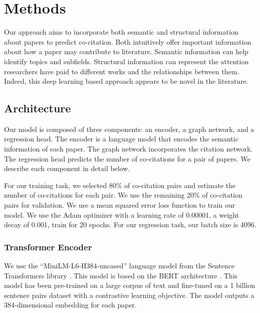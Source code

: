 \documentclass[10pt,twocolumn,letterpaper]{article}
\begin{document}
\section{Methods}


Our approach aims to incorporate both semantic and structural information about papers to predict co-citation. Both intuitively offer important information about how a paper may contribute to literature. Semantic information can help identify topics and subfields. Structural information can represent the attention researchers have paid to different works and the relationships between them. Indeed, this deep learning based approach appears to be novel in the literature. 

\subsection{Architecture}

Our model is composed of three components: an encoder, a graph network, and a regression head. 
The encoder is a language model that encodes the semantic information of each paper. The graph network incorporates the citation network. The regression head predicts the number of co-citations for a pair of papers. We describe each component in detail below.

For our training task, we selected 80\% of co-citation pairs and estimate the number of co-citations for each pair. We use the remaining 20\% of co-citation pairs for validation. 
We use a mean squared error loss function to train our model.
We use the Adam optimizer with a learning rate of 0.00001, a weight decay of 0.001, train for 20 epochs. For our regression task, our batch size is 4096.

\subsubsection{Transformer Encoder}

We use the ``MiniLM-L6-H384-uncased'' language model from the Sentence Transformers library \cite{reimers2019sentence}. This model is based on the BERT architecture \cite{devlin2018bert}. This model has been pre-trained on a large corpus of text and fine-tuned on a 1 billion sentence pairs dataset with a contrastive learning objective. The model outputs a 384-dimensional embedding for each paper.
\end{document}
